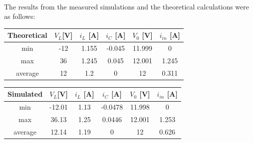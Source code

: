 \documentclass{article}
\begin{document}
\\The results from the measured simulations and the theoretical calculations were as follows:

\begin{center}
 \begin{tabular}{|c |c c c c c||} 
 \hline
  Theoretical & $V_L$[V]& $i_L$ [A] & $i_C$ [A] & $V_0$ [V] & $i_{in}$ [A] \\ [0.5ex] 
 \hline\hline
 min & -12 & 1.155 & -0.045 & 11.999 & 0 \\ 
 \hline
 max & 36 & 1.245 & 0.045 & 12.001 & 1.245\\
 \hline
 average & 12 & 1.2 & 0 & 12 & 0.311 \\
 [1ex] 
 \hline
\end{tabular}
\end{center}

\begin{center}
 \begin{tabular}{|c |c c c c c||} 
 \hline
  Simulated & $V_L$[V]& $i_L$ [A] & $i_C$ [A] & $V_0$ [V] & $i_{in}$ [A] \\ [0.5ex] 
 \hline\hline
 min & -12.01 & 1.13 & -0.0478 & 11.998 & 0 \\
 \hline
 max & 36.13 & 1.25 & 0.0446 & 12.001 & 1.253\\
 \hline
 average & 12.14 & 1.19 & 0 & 12 & 0.626 \\
 [1ex] 
 \hline
\end{tabular}
\end{center}
\end{document}
